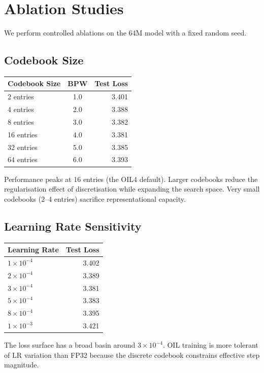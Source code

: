 \section{Ablation Studies}
\label{sec:ablations}
We perform controlled ablations on the 64M model with a fixed random seed.
\subsection{Codebook Size}
\begin{center}
\begin{tabular}{lcr}
\toprule
\textbf{Codebook Size} & \textbf{BPW} & \textbf{Test Loss} \\
\midrule
2 entries  & 1.0 & 3.401 \\
4 entries  & 2.0 & 3.388 \\
8 entries  & 3.0 & 3.382 \\
16 entries & 4.0 & 3.381 \\
32 entries & 5.0 & 3.385 \\
64 entries & 6.0 & 3.393 \\
\bottomrule
\end{tabular}
\end{center}
\begin{table}[h]
\centering
\caption{Effect of codebook size on OIL4 training quality (64M model).}
\label{tab:ablation_codebook}
\end{table}
Performance peaks at 16 entries (the OIL4 default). Larger codebooks reduce the
regularisation effect of discretisation while expanding the search space. Very small
codebooks (2--4 entries) sacrifice representational capacity.
\subsection{Learning Rate Sensitivity}
\begin{center}
\begin{tabular}{lr}
\toprule
\textbf{Learning Rate} & \textbf{Test Loss} \\
\midrule
$1 \times 10^{-4}$ & 3.402 \\
$2 \times 10^{-4}$ & 3.389 \\
$3 \times 10^{-4}$ & 3.381 \\
$5 \times 10^{-4}$ & 3.383 \\
$8 \times 10^{-4}$ & 3.395 \\
$1 \times 10^{-3}$ & 3.421 \\
\bottomrule
\end{tabular}
\end{center}
\begin{table}[h]
\centering
\caption{Learning rate sensitivity for OIL4 training (64M model).}
\label{tab:ablation_lr}
\end{table}
The loss surface has a broad basin around $3 \times 10^{-4}$. OIL training is more tolerant
of LR variation than FP32 because the discrete codebook constrains effective step magnitude.
